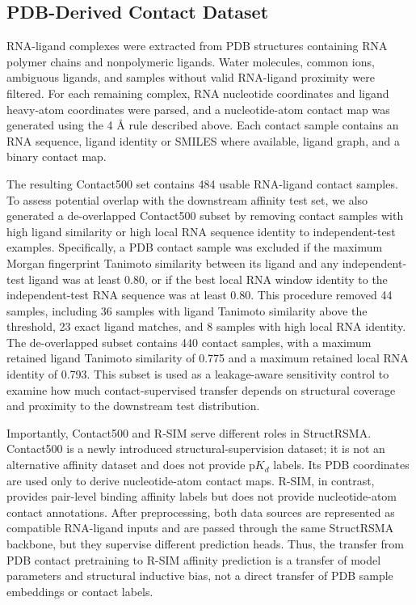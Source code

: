 \documentclass[journal=jcisd8,manuscript=article]{achemso}
\begin{document}
\subsection{PDB-Derived Contact Dataset}

RNA-ligand complexes were extracted from PDB structures containing RNA polymer chains and nonpolymeric ligands. Water molecules, common ions, ambiguous ligands, and samples without valid RNA-ligand proximity were filtered. For each remaining complex, RNA nucleotide coordinates and ligand heavy-atom coordinates were parsed, and a nucleotide-atom contact map was generated using the 4 \AA{} rule described above. Each contact sample contains an RNA sequence, ligand identity or SMILES where available, ligand graph, and a binary contact map.

The resulting Contact500 set contains 484 usable RNA-ligand contact samples. To assess potential overlap with the downstream affinity test set, we also generated a de-overlapped Contact500 subset by removing contact samples with high ligand similarity or high local RNA sequence identity to independent-test examples. Specifically, a PDB contact sample was excluded if the maximum Morgan fingerprint Tanimoto similarity between its ligand and any independent-test ligand was at least 0.80, or if the best local RNA window identity to the independent-test RNA sequence was at least 0.80. This procedure removed 44 samples, including 36 samples with ligand Tanimoto similarity above the threshold, 23 exact ligand matches, and 8 samples with high local RNA identity. The de-overlapped subset contains 440 contact samples, with a maximum retained ligand Tanimoto similarity of 0.775 and a maximum retained local RNA identity of 0.793. This subset is used as a leakage-aware sensitivity control to examine how much contact-supervised transfer depends on structural coverage and proximity to the downstream test distribution.

Importantly, Contact500 and R-SIM serve different roles in StructRSMA. Contact500 is a newly introduced structural-supervision dataset; it is not an alternative affinity dataset and does not provide p$K_d$ labels. Its PDB coordinates are used only to derive nucleotide-atom contact maps. R-SIM, in contrast, provides pair-level binding affinity labels but does not provide nucleotide-atom contact annotations. After preprocessing, both data sources are represented as compatible RNA-ligand inputs and are passed through the same StructRSMA backbone, but they supervise different prediction heads. Thus, the transfer from PDB contact pretraining to R-SIM affinity prediction is a transfer of model parameters and structural inductive bias, not a direct transfer of PDB sample embeddings or contact labels.
\end{document}
